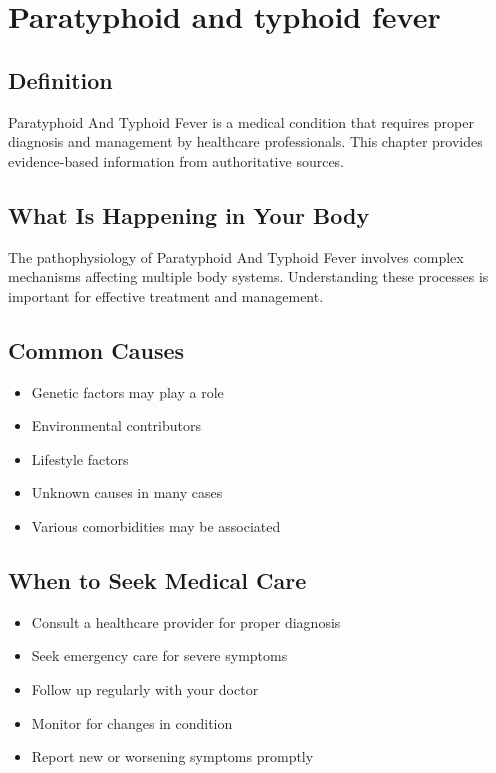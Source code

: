 
\chapter{Paratyphoid and typhoid fever}

\section*{Definition}
Paratyphoid And Typhoid Fever is a medical condition that requires proper diagnosis and management by healthcare professionals. This chapter provides evidence-based information from authoritative sources.

\section*{What Is Happening in Your Body}
The pathophysiology of Paratyphoid And Typhoid Fever involves complex mechanisms affecting multiple body systems. Understanding these processes is important for effective treatment and management.

\section*{Common Causes}
\begin{itemize}
  \item Genetic factors may play a role
  \item Environmental contributors
  \item Lifestyle factors
  \item Unknown causes in many cases
  \item Various comorbidities may be associated
\end{itemize}

\section*{When to Seek Medical Care}
\begin{itemize}
  \item Consult a healthcare provider for proper diagnosis
  \item Seek emergency care for severe symptoms
  \item Follow up regularly with your doctor
  \item Monitor for changes in condition
  \item Report new or worsening symptoms promptly
\end{itemize}

